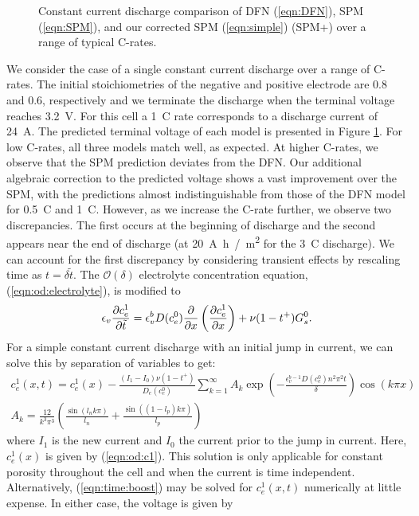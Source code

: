 \documentclass[preprint]{elsarticle}
\begin{document}
\begin{figure}[h]
	\centering
	\voltage
	\caption{Constant current discharge comparison of DFN (\ref{eqn:DFN}), SPM (\ref{eqn:SPM}), and our corrected SPM (\ref{eqn:simple}) (SPM+) over a range of typical C-rates.} \label{fig:voltage} 
\end{figure}

We consider the case of a single constant current discharge over a range of C-rates. The initial stoichiometries of the negative and positive electrode are 0.8 and 0.6, respectively and we terminate the discharge when the terminal voltage reaches \SI{3.2}{V}. For this cell a \SI{1}{C} rate corresponds to a discharge current of \SI{24}{A}. The predicted terminal voltage of each model is presented in Figure \ref{fig:voltage}. For low C-rates, all three models match well, as expected. At higher C-rates, we observe that the SPM prediction deviates from the DFN. Our additional algebraic correction to the predicted voltage shows a vast improvement over the SPM, with the predictions almost indistinguishable from those of the DFN model for \SI{0.5}{C} and \SI{1}{C}. However, as we increase the C-rate further, we observe two discrepancies. The first occurs at the beginning of discharge and the second appears near the end of discharge (at \SI{20}{A h / m^2} for the \SI{3}{C} discharge). We can account for the first discrepancy by considering transient effects by rescaling time as $t = \delta \tilde{t}$. The $\mathcal{O}(\delta)$ electrolyte concentration equation, (\ref{eqn:od:electrolyte}), is modified to 
\begin{equation}\label{eqn:time:boost} 
	\epsilon_v\pdv{c_e^1}{\tilde{t}} = \epsilon_v^b D(c_e^0) \pdv{x}\left(\pdv{c_e^1}{x}\right) + \nu (1-t^+) G_s^0.
\end{equation}
For a simple constant current discharge with an initial jump in current, we can solve this by separation of variables to get: 
\begin{gather} 
	c_e^1(x,t) = c_e^1(x) - \frac{(I_1-I_0)\nu (1-t^+)}{D_e(c_e^0)}\sum_{k=1}^{\infty} A_k \exp\left(-\frac{\epsilon^{b-1}_v D(c_e^0) n^2 \pi^2 t}{\delta}\right) \cos(k\pi x) \\ 
    A_k = \frac{12}{k^3 \pi^3}\left(\frac{\sin(l_n k\pi)}{l_n} + \frac{\sin( (1-l_p) k \pi)}{l_p}\right)
\end{gather} 
where $I_1$ is the new current and $I_0$ the current prior to the jump in current. Here, $c_e^1(x)$ is given by (\ref{eqn:od:c1}). This solution is only applicable for constant porosity throughout the cell and when the current is time independent.  Alternatively, (\ref{eqn:time:boost}) may be solved for $c_e^1(x,t)$ numerically at little expense. In either case, the voltage is given by 
\end{document}
